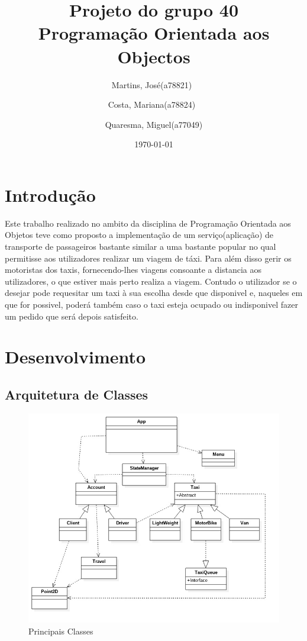 \documentclass[a4paper,12pt,portuguese]{report}
\title{Projeto do grupo 40 \\ Programação Orientada aos Objectos}
\author{Martins, José(a78821)\
        \and
        Costa, Mariana(a78824)\
        \and
        Quaresma, Miguel(a77049)
        }
\date{\today}
\begin{document}
 
\begin{titlepage}
\maketitle
\end{titlepage}
 
\tableofcontents
 
\chapter{Introdução}
Este trabalho realizado no ambito da disciplina de Programação Orientada aos Objetos teve como proposto a implementação de um serviço(aplicação) de transporte de passageiros bastante similar a uma bastante popular no qual permitisse aos utilizadores realizar um viagem de táxi. Para além disso gerir os motoristas dos taxis, fornecendo-lhes viagens consoante a distancia aos utilizadores, o que estiver mais perto realiza a viagem. Contudo o utilizador se o desejar pode requesitar um taxi à sua escolha desde que disponivel e, naqueles em que for possivel, poderá também caso o taxi esteja ocupado ou indisponivel fazer um pedido que será depois satisfeito.

\chapter{Desenvolvimento}

\section{Arquitetura de Classes}

\begin{figure}[ht!]
    \centering
        \includegraphics[width=120mm]{graph.jpg}
    \caption{Principais Classes}
\end{figure}
\end{document}
